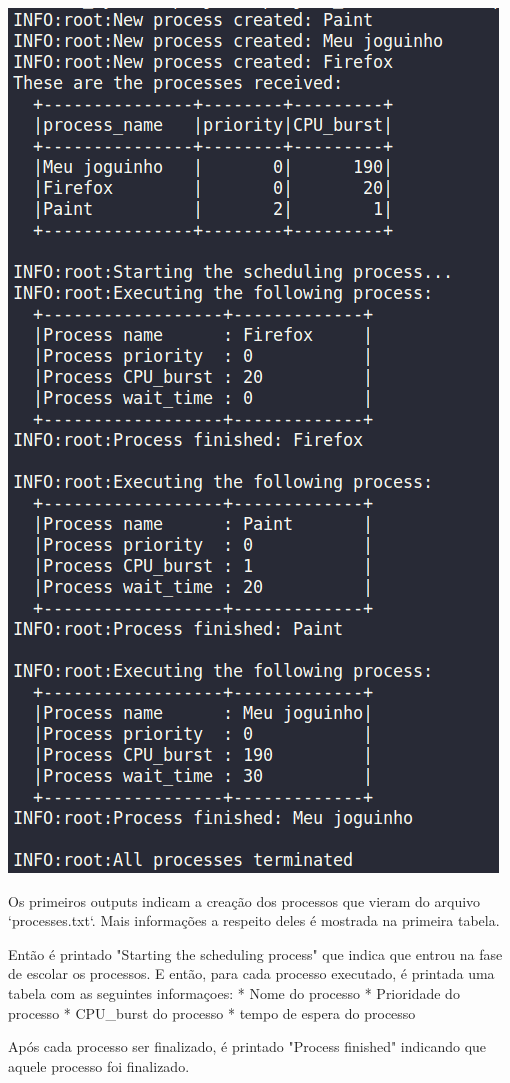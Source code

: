 \includegraphics{images/SO_p1p1}

Os primeiros outputs indicam a creação dos processos que vieram do arquivo `processes.txt`. Mais informações a respeito deles é mostrada na primeira tabela.

Então é printado "Starting the scheduling process" que indica que entrou na fase de escolar os processos. E então, para cada processo executado, é printada uma tabela com as seguintes informaçoes:
* Nome do processo
* Prioridade do processo
* CPU_burst do processo
* tempo de espera do processo

Após cada processo ser finalizado, é printado "Process finished" indicando que aquele processo foi finalizado.

